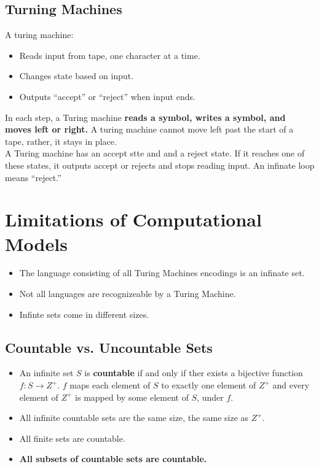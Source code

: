 \documentclass[a4paper]{article}
\begin{document}
\begin{multicols}{2}
	\subsection{Turning Machines}
	A turing machine:
	\begin{itemize}
		\item Reads input from tape, one character at a time.
		\item Changes state based on input.
		\item Outputs ``accept'' or ``reject'' when input ends.
	\end{itemize}
	In each step, a Turing machine \textbf{reads a symbol, writes a symbol, and
	moves left or right.} A turing machine cannot move left past the start of a
  tape, rather, it stays in place. \\
	A Turing machine has an accept stte and and a reject state. If it reaches one
	of these states, it outputs accept or rejects and stops reading input. An
	infinate loop means ``reject.'' \\

	\section{Limitations of Computational Models}
	\begin{itemize}
		\item The language consisting of all Turing Machines encodings is an
					infinate set.
		\item Not all languages are recognizeable by a Turing Machine.
		\item Infinte sets come in different sizes.
	\end{itemize}
	\subsection{Countable vs. Uncountable Sets}
	\begin{itemize}
		\item An infinite set $S$ is \textbf{countable} if and only if ther exists a
					bijective function $f: S \rightarrow Z^+$. $f$ maps each element of
					$S$ to exactly one element of $Z^+$ and every element of $Z^+$ is
					mapped by some element of $S$, under $f$.
		\item All infinite countable sets are the same size, the same size as $Z^+$.
		\item All finite sets are countable.
		\item \textbf{All subsets of countable sets are countable.}
	\end{itemize}

\end{multicols}
\end{document}
